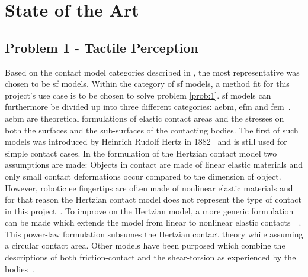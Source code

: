 \chapter{State of the Art}\label{ch:state-of-the-art}

\section{Problem 1 - Tactile Perception}\label{sec:lit-rev-problem-1}

Based on the contact model categories described in , the most representative was chosen to be \gls{sf} models. 
Within the category of \gls{sf} models, a method fit for this project's use case is to be chosen to solve problem \ref{prob:1}. \gls{sf} models can furthermore be divided up into three different categories: \gls{aebm}, \gls{efm} and \gls{fem}~\cite{a-modified-elastic-foundation-contact-model-for-application-in-3d-models-of-the-prosthetic-knee}. \medskip
\gls{aebm} are theoretical formulations of elastic contact areas and the stresses on both the surfaces and the sub-surfaces of the contacting bodies. The first of such models was introduced by Heinrich Rudolf Hertz in 1882~\cite{on-the-contact-of-rigid-elastic-solids-and-on-hardness} and is still used for simple contact cases. In the formulation of the Hertzian contact model two assumptions are made: Objects in contact are made of linear elastic materials and only small contact deformations occur compared to the dimension of object. However, robotic \gls{ee} fingertips are often made of nonlinear elastic materials and for that reason the Hertzian contact model does not represent the type of contact in this project~\cite[Chapter 37]{handbook-of-robotics}. To improve on the Hertzian model, a more generic formulation can be made which extends the model from linear to nonlinear elastic contacts~\cite{modeling-of-contact-mechanics-and-friction-limit-surfaces-for-soft-fingers-in-robotics-with-experimental-results}~\cite{the-haptic-and-perceptional-characteristics-of-an-anthropomorphic-curved-soft-finger-structure}. This power-law formulation subsumes the Hertzian contact theory while assuming a circular contact area. Other models have been purposed which combine the descriptions of both friction-contact and the shear-torsion as experienced by the bodies~\cite{the-sliding-of-robot-fingers-under-combined-torsion-and-shear-loading}. \medskip


